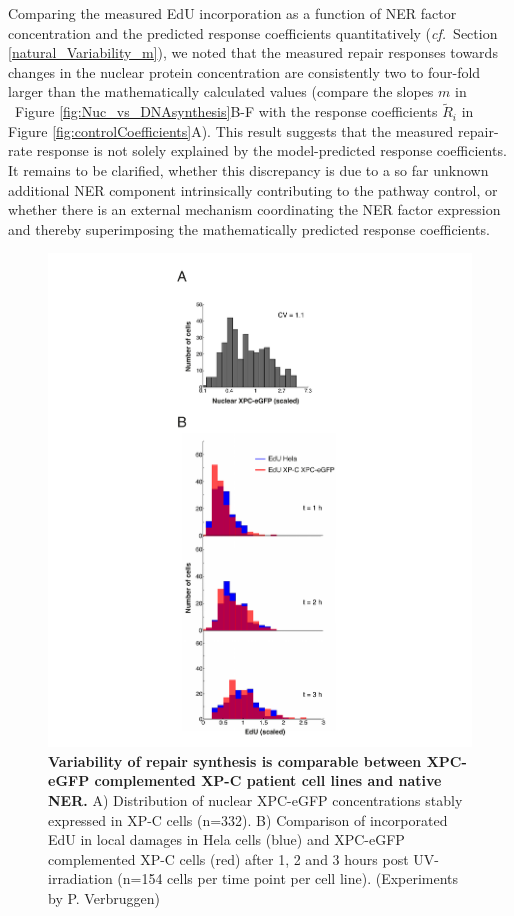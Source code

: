 Comparing the measured EdU incorporation as a function of NER factor concentration and the predicted response coefficients quantitatively (\textit{cf.}\ Section \ref{natural_Variability_m}), we noted that the measured repair responses towards changes in the nuclear protein concentration are consistently two to four-fold larger than the mathematically calculated values (compare the slopes $m$ in \ Figure \ref{fig:Nuc_vs_DNAsynthesis}B-F with the response coefficients $\tilde{R}_i$ in Figure \ref{fig:controlCoefficients}A). This result suggests that the measured repair-rate response is not solely explained by the model-predicted response coefficients. It remains to be clarified, whether this discrepancy is due to a so far unknown additional NER component intrinsically contributing to the pathway control, or whether there is an external mechanism coordinating the NER factor expression and thereby superimposing the mathematically predicted response coefficients.

\begin{figure}[htbp]
	\begin{center}
		\includegraphics[width=1\textwidth]{Abbildungen/figure3_4.pdf}
		\caption{\textbf{Variability of repair synthesis is comparable between XPC-eGFP complemented XP-C patient cell lines and native NER.} A) Distribution of nuclear XPC-eGFP concentrations stably expressed in XP-C cells (n=332). B) Comparison of incorporated EdU in local damages in Hela cells (blue) and XPC-eGFP complemented XP-C cells (red) after 1, 2 and 3 hours post UV-irradiation (n=154 cells per time point per cell line). (Experiments by P. Verbruggen)}
		\label{fig:consistVariability}
	\end{center}
\end{figure}


